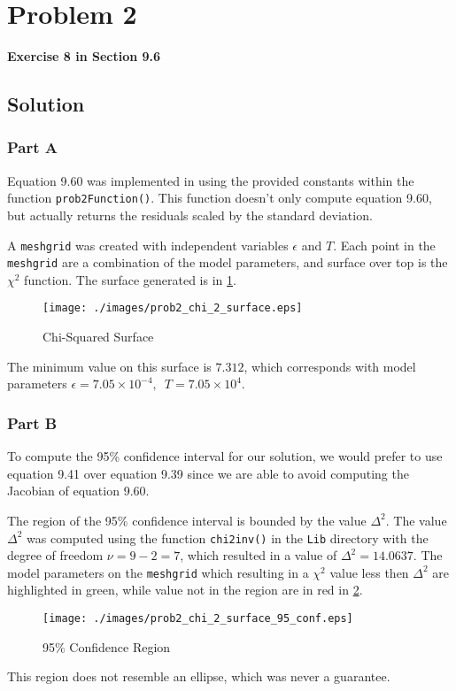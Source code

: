 
\begingroup
\allowdisplaybreaks

\newpage
\section{Problem 2}

\textbf{Exercise 8 in Section 9.6}

\subsection{Solution}

\subsubsection{Part A}

Equation 9.60 was implemented in \MATLAB using the provided constants within the function \verb|prob2Function()|. This function doesn't only compute equation 9.60, but actually returns the residuals scaled by the standard deviation. 

A \verb|meshgrid| was created with independent variables $\epsilon$ and $T$. Each point in the \verb|meshgrid| are a combination of the model parameters, and surface over top is the $\chi^2$ function. The surface generated is in \ref{fig: prob2 chi2 surface}.

\begin{figure}[h] 
	\centering
	\texttt{[image: ./images/prob2\_chi\_2\_surface.eps]}
	\caption{Chi-Squared Surface}
	\label{fig: prob2 chi2 surface}
\end{figure}
\FloatBarrier

The minimum value on this surface is $7.312$, which corresponds with model parameters $\epsilon = 7.05 \times 10^{-4},\,\,\,T = 7.05 \times 10^{4}$. 


\subsubsection{Part B}

To compute the 95\% confidence interval for our solution, we would prefer to use equation 9.41 over equation 9.39 since we are able to avoid computing the Jacobian of equation 9.60. 

The region of the 95\% confidence interval is bounded by the value $\Delta^2$. The value $\Delta^2$ was computed using the function \verb|chi2inv()| in the \verb|Lib| directory with the degree of freedom $\nu =9 - 2 = 7$, which resulted in a value of $\Delta^2 = 14.0637$. The model parameters on the \verb|meshgrid| which resulting in a $\chi^2$ value less then $\Delta^2$ are highlighted in green, while value not in the region are in red in \ref{fig: prob2 chi2 surface 95 conf}.

\begin{figure}[h] 
	\centering
	\texttt{[image: ./images/prob2\_chi\_2\_surface\_95\_conf.eps]}
	\caption{95\% Confidence Region}
	\label{fig: prob2 chi2 surface 95 conf}
\end{figure}
\FloatBarrier

This region does not resemble an ellipse, which was never a guarantee. 

